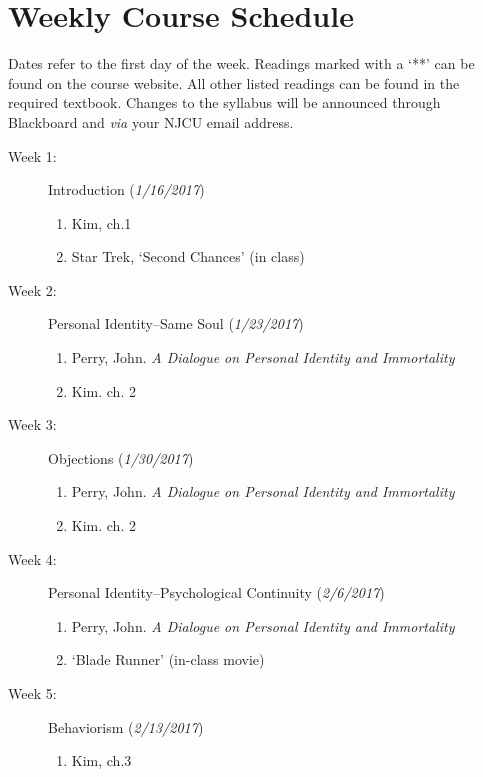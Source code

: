 \documentclass[article,oneside]{memoir}
\begin{document}
\section{Weekly Course Schedule}
Dates refer to the first day of the week. Readings marked with a `**' can be found on the course website. All other listed readings can be found in the required textbook. Changes to the syllabus will be announced through Blackboard and \emph{via} your NJCU email address. \newline





\begin{description}

\item[Week 1: ] Introduction (\emph{1/16/2017})
\begin{enumerate}
\item Kim, ch.1
\item Star Trek, `Second Chances' (in class)  
\end{enumerate}

\item[Week 2:]  Personal Identity--Same Soul (\emph{1/23/2017})
\begin{enumerate}
\item Perry, John. \emph{A Dialogue on Personal Identity and Immortality}
\item Kim. ch. 2
\end{enumerate}


\item[Week 3:]  Objections (\emph{1/30/2017})
\begin{enumerate}
\item Perry, John. \emph{A Dialogue on Personal Identity and Immortality}
\item Kim. ch. 2
\end{enumerate}


\item[Week 4: ] Personal Identity--Psychological Continuity (\emph{2/6/2017})
\begin{enumerate}
\item Perry, John. \emph{A Dialogue on Personal Identity and Immortality}
\item `Blade Runner' (in-class movie)
\end{enumerate}

\item[Week 5: ] Behaviorism  (\emph{2/13/2017})
\begin{enumerate}
\item Kim, ch.3
 \end{enumerate}
 

\end{description}
\end{document}
